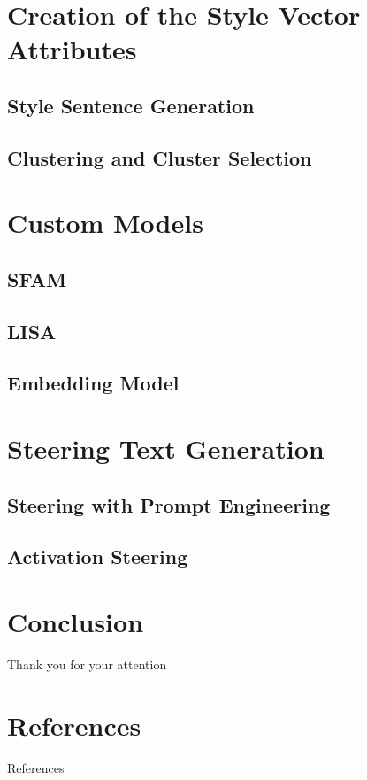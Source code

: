 \documentclass[t]{beamer}
\begin{document}
\section{Creation of the Style Vector Attributes}
\subsection{Style Sentence Generation}
\begin{frame}{}

\end{frame}

\subsection{Clustering and Cluster Selection}
\begin{frame}{}

\end{frame}


\section{Custom Models}
\subsection{SFAM}

\subsection{LISA}

\subsection{Embedding Model}


\section{Steering Text Generation}
\subsection{Steering with Prompt Engineering}

\subsection{Activation Steering}


\section{Conclusion}



\begin{frame}[c]
  \centering \Large
  Thank you for your attention
\end{frame}


\section*{References}
\begin{frame}[allowframebreaks]{References}
  \printbibliography
\end{frame}
\end{document}
